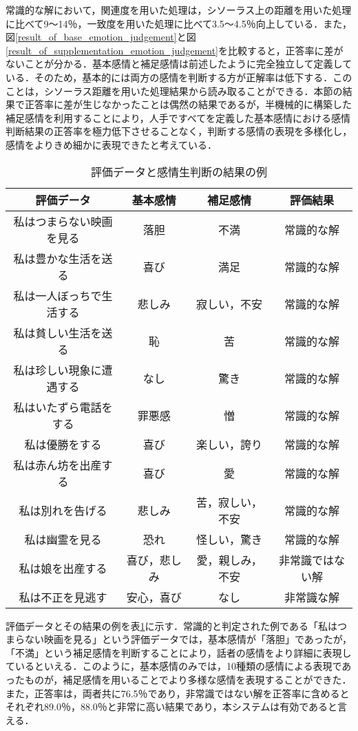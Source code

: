 \documentclass[japanese]{jnlp_1.3a}
\begin{document}
常識的な解において，関連度を用いた処理は，シソーラス上の距離を用いた処理に比べて9〜14{\kern0pt}％，一致度を用いた処理に比べて3.5〜4.5{\kern0pt}％向上している．また，図\ref{result_of_base_emotion_judgement}と図\ref{result_of_supplementation_emotion_judgement}を比較すると，正答率に差がないことが分かる．基本感情と補足感情は前述したように完全独立して定義している．そのため，基本的には両方の感情を判断する方が正解率は低下する．このことは，シソーラス距離を用いた処理結果から読み取ることができる．本節の結果で正答率に差が生じなかったことは偶然の結果であるが，半機械的に構築した補足感情を利用することにより，人手ですべてを定義した基本感情における感情判断結果の正答率を極力低下させることなく，判断する感情の表現を多様化し，感情をよりきめ細かに表現できたと考えている．


\begin{table}[b]
\caption{評価データと感情生判断の結果の例}
\label{example_of_result}
\begin{center}
\begin{tabular}{|c|c|c|c|} \hline
評価データ & 基本感情 & 補足感情 & 評価結果 \\ \hline\hline
私はつまらない映画を見る & 落胆 & 不満 & 常識的な解 \\ \hline
私は豊かな生活を送る & 喜び & 満足 & 常識的な解 \\ \hline
私は一人ぼっちで生活する & 悲しみ & 寂しい，不安 & 常識的な解 \\ \hline
私は貧しい生活を送る & 恥 & 苦 & 常識的な解 \\ \hline
私は珍しい現象に遭遇する & なし & 驚き & 常識的な解 \\ \hline
私はいたずら電話をする & 罪悪感 & 憎 & 常識的な解 \\ \hline
私は優勝をする & 喜び & 楽しい，誇り & 常識的な解 \\ \hline
私は赤ん坊を出産する & 喜び & 愛 & 常識的な解 \\ \hline
私は別れを告げる & 悲しみ & 苦，寂しい，不安 & 常識的な解 \\ \hline
私は幽霊を見る & 恐れ & 怪しい，驚き & 常識的な解 \\ \hline
私は娘を出産する & 喜び，悲しみ & 愛，親しみ，不安 & 非常識ではない解 \\ \hline
私は不正を見逃す & 安心，喜び & なし & 非常識な解 \\ \hline
\end{tabular}
\end{center}
\end{table}

評価データとその結果の例を表\ref{example_of_result}に示す．常識的と判定された例である「私はつまらない映画を見る」という評価データでは，基本感情が「落胆」であったが，「不満」という補足感情を判断することにより，話者の感情をより詳細に表現しているといえる．このように，基本感情のみでは，10種類の感情による表現であったものが，補足感情を用いることでより多様な感情を表現することができた．また，正答率は，両者共に76.5{\kern0pt}％であり，非常識ではない解を正答率に含めるとそれぞれ89.0{\kern0pt}％，88.0{\kern0pt}％と非常に高い結果であり，本システムは有効であると言える．
\end{document}
